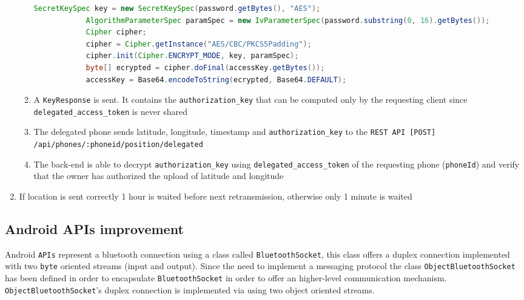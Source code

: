 \documentclass[conference, 11pt]{IEEEtran}
\begin{document}
\begin{enumerate}
\begin{enumerate}
			\begin{lstlisting}[language=Java, caption=AES password encryption]
			SecretKeySpec key = new SecretKeySpec(password.getBytes(), "AES");
			AlgorithmParameterSpec paramSpec = new IvParameterSpec(password.substring(0, 16).getBytes());
			Cipher cipher;
			cipher = Cipher.getInstance("AES/CBC/PKCS5Padding");	    
			cipher.init(Cipher.ENCRYPT_MODE, key, paramSpec);			    	
			byte[] ecrypted = cipher.doFinal(accessKey.getBytes());
			accessKey = Base64.encodeToString(ecrypted, Base64.DEFAULT);
			\end{lstlisting}	
			\item A \texttt{KeyResponse} is sent. It contains the \texttt{authorization\_key} that can be computed only by the requesting client since \texttt{delegated\_access\_token} is never shared
			\item The delegated phone sends latitude, longitude, timestamp and \texttt{authorization\_key} to the \texttt{REST API [POST] /api\allowbreak/phones\allowbreak/:phoneid\allowbreak/position/delegated}
			\item The back-end is able to decrypt \texttt{authorization\_key} using \texttt{delegated\_access\_token} of the requesting phone (\texttt{phoneId}) and verify that the owner has authorized the upload of latitude and longitude
		\end{enumerate}
	\item If location is sent correctly 1 hour is waited before next retransmission, otherwise only 1 minute is waited
\end{enumerate}

\subsection{\textbf{Android APIs improvement}}
Android \texttt{APIs} represent a bluetooth connection using a class called \texttt{BluetoothSocket}, this class offers a duplex connection implemented with two \texttt{byte} oriented streams (input and output). Since the need to implement a messaging protocol the class \texttt{ObjectBluetoothSocket} has been defined in order to encapsulate \texttt{BluetoothSocket} in order to offer an higher-level communication mechanism. \texttt{ObjectBluetoothSocket}'s duplex connection is implemented via using two object oriented streams.
\end{document}
